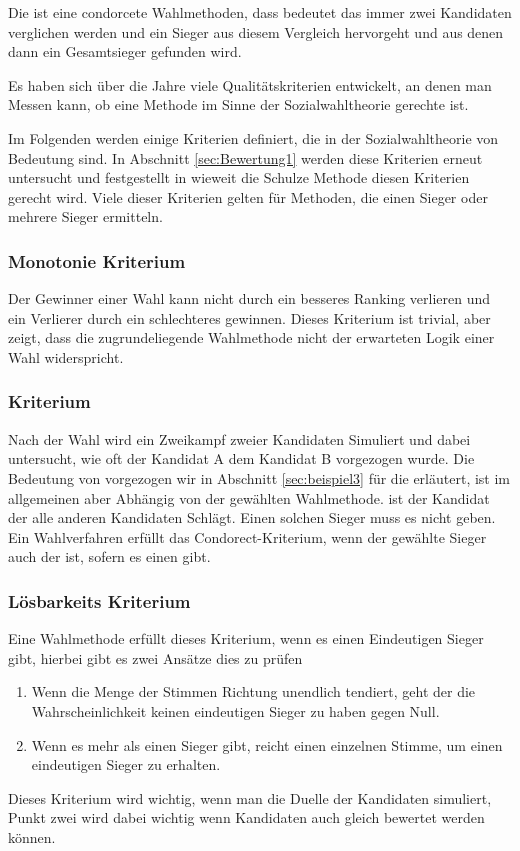 Die \schulze ist eine condorcete Wahlmethoden, dass bedeutet das immer zwei Kandidaten verglichen werden und ein Sieger aus diesem Vergleich hervorgeht und aus denen dann ein Gesamtsieger gefunden wird. 

Es haben sich über die Jahre viele Qualitätskriterien entwickelt, an denen man Messen kann, ob eine Methode im Sinne der Sozialwahltheorie \glqq gerechte\grqq{} ist.

Im Folgenden werden einige Kriterien definiert, die in der Sozialwahltheorie von Bedeutung sind. In Abschnitt \ref{sec:Bewertung1} werden diese Kriterien erneut untersucht und festgestellt in wieweit die Schulze Methode diesen Kriterien gerecht wird. Viele dieser Kriterien gelten für Methoden, die einen Sieger oder mehrere Sieger ermitteln. 

\subsubsection{Monotonie Kriterium} 
\label{sec:monotoniekriterium}
Der Gewinner einer Wahl kann nicht durch ein besseres Ranking verlieren und ein Verlierer durch ein schlechteres gewinnen. \citep{Woodall1996} Dieses Kriterium ist trivial, aber zeigt, dass die zugrundeliegende Wahlmethode nicht der erwarteten Logik einer Wahl widerspricht.

\subsubsection{\condorcet Kriterium} 
\label{sec:condorectKriterium}
Nach der Wahl wird ein Zweikampf zweier Kandidaten Simuliert und dabei untersucht, wie oft der Kandidat A dem Kandidat B vorgezogen wurde. Die Bedeutung von \glqq vorgezogen\grqq{} wir in Abschnitt \ref{sec:beispiel3} für die \schulze erläutert, ist im allgemeinen aber Abhängig von der gewählten Wahlmethode. \condorcetSieger ist der Kandidat der alle anderen Kandidaten Schlägt. Einen solchen Sieger muss es nicht geben. Ein Wahlverfahren erfüllt das Condorect-Kriterium, wenn der gewählte Sieger auch der \condorcetSieger ist, sofern es einen \condorcetSieger gibt. \citep{Johnson2005}

\subsubsection{Lösbarkeits Kriterium} 
\label{sec:loesbarkeitsKriterium}
Eine Wahlmethode erfüllt dieses Kriterium, wenn es einen Eindeutigen Sieger gibt, hierbei gibt es zwei Ansätze dies zu prüfen \citep{Schulze2017}
\begin{enumerate}
\item Wenn die Menge der Stimmen Richtung unendlich tendiert, geht der die Wahrscheinlichkeit keinen eindeutigen Sieger zu haben gegen Null.
\item Wenn es mehr als einen Sieger gibt, reicht einen einzelnen Stimme, um einen eindeutigen Sieger zu erhalten.
\end{enumerate}
Dieses Kriterium wird wichtig, wenn man die Duelle der Kandidaten simuliert, Punkt zwei wird dabei wichtig wenn Kandidaten auch gleich bewertet werden können.

